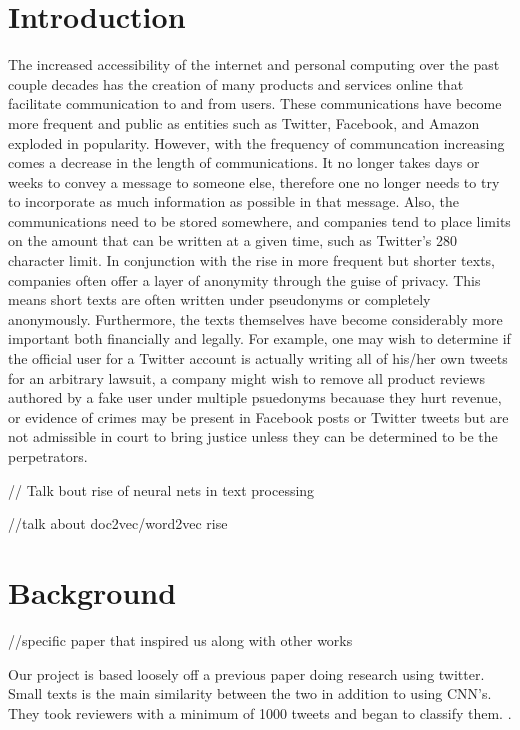\documentclass[conference]{IEEEtran}
\begin{document}
\section{Introduction}
The increased accessibility of the internet and personal computing over the past couple decades has the creation of many products and services online that facilitate communication to and from users. These communications have become more frequent and public as entities such as Twitter, Facebook, and Amazon exploded in popularity. However, with the frequency of communcation increasing comes a decrease in the length of communications. It no longer takes days or weeks to convey a message to someone else, therefore one no longer needs to try to incorporate as much information as possible in that message. Also, the communications need to be stored somewhere, and companies tend to place limits on the amount that can be written at a given time, such as Twitter's 280 character limit. In conjunction with the rise in more frequent but shorter texts, companies often offer a layer of anonymity through the guise of privacy. This means short texts are often written under pseudonyms or completely anonymously. Furthermore, the texts themselves have become considerably more important both financially and legally.\cite{b1} For example, one may wish to determine if the official user for a Twitter account is actually writing all of his/her own tweets for an arbitrary lawsuit, a company might wish to remove all product reviews authored by a fake user under multiple psuedonyms becauase they hurt revenue,  or evidence of crimes may be present in Facebook posts or Twitter tweets but are not admissible in court to bring justice unless they can be determined to be the perpetrators.


// Talk bout rise of neural nets in text processing

//talk about doc2vec/word2vec rise


\section{Background}

//specific paper that inspired us along with other works

Our project is based loosely off a previous paper doing research using twitter. Small texts is the main similarity between the two in addition to using CNN's. They took reviewers with a minimum of 1000 tweets and began to classify them. \cite{b2}.
\end{document}
